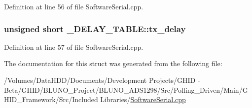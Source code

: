 \-Definition at line 56 of file \-Software\-Serial.\-cpp.

\hypertarget{struct___d_e_l_a_y___t_a_b_l_e_a20098fe273924c2456690a6ea96dc891}{
\subsubsection[{tx\-\_\-delay}]{\setlength{\rightskip}{0pt plus 5cm}unsigned short {\bf \-\_\-\-D\-E\-L\-A\-Y\-\_\-\-T\-A\-B\-L\-E\-::tx\-\_\-delay}}}\label{struct___d_e_l_a_y___t_a_b_l_e_a20098fe273924c2456690a6ea96dc891}


\-Definition at line 57 of file \-Software\-Serial.\-cpp.



\-The documentation for this struct was generated from the following file\-:\begin{DoxyCompactItemize}
\item 
/\-Volumes/\-Data\-H\-D\-D/\-Documents/\-Development Projects/\-G\-H\-I\-D -\/ Beta/\-G\-H\-I\-D/\-B\-L\-U\-N\-O\-\_\-\-Project/\-B\-L\-U\-N\-O\-\_\-\-A\-D\-S1298/\-Src/\-Polling\-\_\-\-Driven/\-Main/\-G\-H\-I\-D\-\_\-\-Framework/\-Src/\-Included Libraries/\hyperlink{_software_serial_8cpp}{\-Software\-Serial.\-cpp}\end{DoxyCompactItemize}
